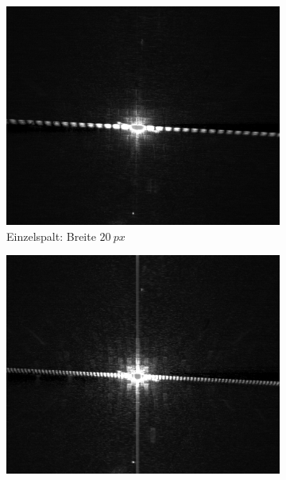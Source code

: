 \documentclass[
	a4paper,
	12pt,
	pagesize,
	ngerman
]{scrartcl}
\begin{document}
		\begin{figure}[H]
        \centering
        \begin{subfigure}[b]{0.475\textwidth}
            \centering
            \includegraphics[width=\textwidth]{raw/singleslid_20_width}
            \caption%
            {Einzelspalt: Breite $\SI{20}{px}$}
            \label{fig_singleslid_20}
        \end{subfigure}
        \hfill
        \begin{subfigure}[b]{0.475\textwidth}
            \centering
            \includegraphics[width=\textwidth]{raw/singleslid_50_width}

\end{subfigure}
\end{figure}
\end{document}
